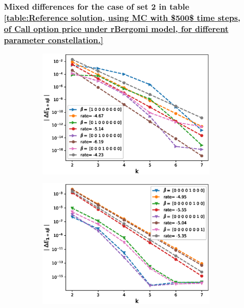 \documentclass[11pt]{article}
\begin{document}
\subsubsection{Mixed differences for the case of set 2 in table \ref{table:Reference solution, using MC with $500$ time steps, of Call option price under rBergomi model, for different parameter constellation.}}\label{Mixed differences for the case of set 2}
\begin{figure}[h!]
	\centering
	\begin{subfigure}{.4\textwidth}
		\centering
		\includegraphics[width=1\linewidth]{./figures/rBergomi_mixed_error_rates/without_change_measure/N_4/H_007/first_difference_rbergomi_4steps_H_007_K_1_totally_hierarch_with_rate_W1}
		\caption{}
		\label{fig:sub3}
	\end{subfigure}%
	\begin{subfigure}{.4\textwidth}
		\centering
		\includegraphics[width=1\linewidth]{./figures/rBergomi_mixed_error_rates/without_change_measure/N_4/H_007/first_difference_rbergomi_4steps_H_007_K_1_totally_hierarch_with_rate_W2}
		\caption{}
		\label{fig:sub4}
	\end{subfigure}




\end{figure}
\end{document}

